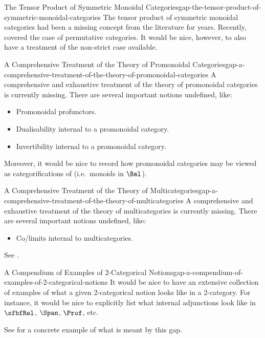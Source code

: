 \begin{gap}{The Tensor Product of Symmetric Monoidal Categories}{gap-the-tensor-product-of-symmetric-monoidal-categories}%
    The tensor product of symmetric monoidal categories had been a missing concept from the literature for years. Recently, \cite{the-symmetric-monoidal-2-category-of-permutative-categories} covered the case of permutative categories. It would be nice, however, to also have a treatment of the non-strict case available.
\end{gap}
\begin{gap}{A Comprehensive Treatment of the Theory of Promonoidal Categories}{gap-a-comprehensive-treatment-of-the-theory-of-promonoidal-categories}%
    A comprehensive and exhaustive treatment of the theory of promonoidal categories is currently missing. There are several important notions undefined, like:
    \begin{itemize}
        \item Promonoidal profunctors.
        \item Dualisability internal to a promonoidal category.
        \item Invertibility internal to a promonoidal category.
    \end{itemize}
    Moreover, it would be nice to record how promonoidal categories may be viewed as categorifications of  (i.e.\ monoids in $\Rel$).
\end{gap}
\begin{gap}{A Comprehensive Treatment of the Theory of Multicategories}{gap-a-comprehensive-treatment-of-the-theory-of-multicategories}%
    A comprehensive and exhaustive treatment of the theory of multicategories is currently missing. There are several important notions undefined, like:
    \begin{itemize}
        \item Co/limits internal to multicategories.
    \end{itemize}
    See \cite{MO484647}.
\end{gap}
\begin{gap}{A Compendium of Examples of 2-Categorical Notions}{gap-a-compendium-of-examples-of-2-categorical-notions}%
    It would be nice to have an extensive collection of examples of what a given 2-categorical notion looks like in a 2-category. For instance, it would be nice to explicitly list what internal adjunctions look like in $\sfbfRel$, $\Span$, $\Prof$, etc.

    \indent See  for a concrete example of what is meant by this gap.
\end{gap}
